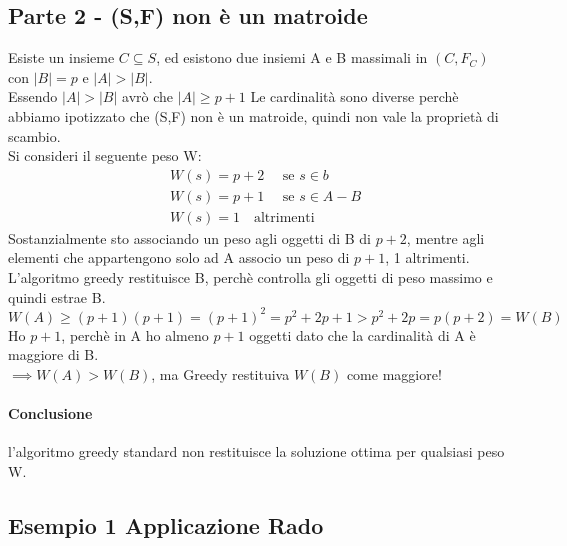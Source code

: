 \subsection{Parte 2 - (S,F) non è un matroide}
Esiste un insieme $C \subseteq S$, ed esistono due insiemi A e B massimali in $(C, F_C)$ con $|B|=p$ e $|A| > |B|$.\\
Essendo $|A| > |B|$ avrò che $|A| \geq p+1$ 
Le cardinalità sono diverse perchè abbiamo ipotizzato che (S,F) non è un matroide, quindi non vale la proprietà di scambio.\\
Si consideri il seguente peso W:
\begin{align*}
    &W(s) = p+2 \quad \text{ se } s \in b\\
    &W(s) = p+1 \quad \text{ se } s \in A-B\\
    &W(s) = 1 \quad \text{altrimenti}
\end{align*}
Sostanzialmente sto associando un peso agli oggetti di B di $p+2$, mentre agli elementi che appartengono solo ad A associo
un peso di $p+1$, 1 altrimenti.\\
L'algoritmo greedy restituisce B, perchè controlla gli oggetti di peso massimo e quindi estrae B.\\
$W(A) \geq (p+1)(p+1) = (p+1)^2 = p^2 + 2p + 1 > p^2 + 2p = p(p+2) = W(B)$\\
Ho $p+1$, perchè in A ho almeno $p+1$ oggetti dato che la cardinalità di A è maggiore di B.\\
$\implies W(A) > W(B)$, ma Greedy restituiva $W(B)$ come maggiore!\\
\paragraph*{Conclusione} l'algoritmo greedy standard non restituisce la soluzione ottima per
qualsiasi peso W.

\subsection{Esempio 1 Applicazione Rado}
